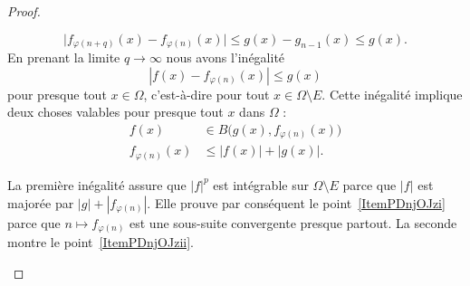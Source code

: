 \begin{proof}
\begin{subproof}
\begin{equation}
			\big| f_{\varphi(n+q)}(x)-f_{\varphi(n)}(x) \big|\leq g(x)-g_{n-1}(x)\leq g(x).
		\end{equation}
		En prenant la limite \( q\to \infty\) nous avons l'inégalité
		\begin{equation}    \label{EqMQbDRac}
			| f(x)-f_{\varphi(n)}(x) |\leq g(x)
		\end{equation}
		pour presque tout \( x\in\Omega\), c'est-à-dire pour tout \( x\in\Omega\setminus E\). Cette inégalité implique deux choses valables pour presque tout \( x\) dans \( \Omega\) :
		\begin{subequations}
			\begin{align}
				f(x)              & \in B\big( g(x),f_{\varphi(n)}(x) \big) \\
				f_{\varphi(n)}(x) & \leq | f(x) |+| g(x) |.
			\end{align}
		\end{subequations}

		La première inégalité assure que \( | f |^p\) est intégrable sur \( \Omega\setminus E\) parce que \( | f |\) est majorée par \( | g |+| f_{\varphi(n)} |\). Elle prouve par conséquent le point~\ref{ItemPDnjOJzi} parce que \(n\mapsto f_{\varphi(n)}\) est une sous-suite convergente presque partout. La seconde montre le point~\ref{ItemPDnjOJzii}.


\end{subproof}
\end{proof}
